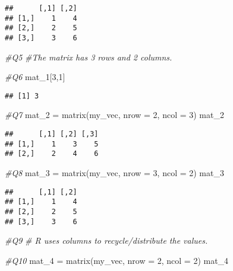 \documentclass[
]{article}
\newenvironment{Shaded}{\begin{snugshade}}{\end{snugshade}}
\newcommand{\AttributeTok}[1]{\textcolor[rgb]{0.77,0.63,0.00}{#1}}
\newcommand{\CommentTok}[1]{\textcolor[rgb]{0.56,0.35,0.01}{\textit{#1}}}
\newcommand{\DecValTok}[1]{\textcolor[rgb]{0.00,0.00,0.81}{#1}}
\newcommand{\FunctionTok}[1]{\textcolor[rgb]{0.00,0.00,0.00}{#1}}
\newcommand{\NormalTok}[1]{#1}
\newcommand{\OtherTok}[1]{\textcolor[rgb]{0.56,0.35,0.01}{#1}}
\begin{document}
\begin{verbatim}
##      [,1] [,2]
## [1,]    1    4
## [2,]    2    5
## [3,]    3    6
\end{verbatim}

\begin{Shaded}
\begin{Highlighting}[]
\CommentTok{\#Q5}
\CommentTok{\#The matrix has 3 rows and 2 columns.}

\CommentTok{\#Q6}
\NormalTok{mat\_1[}\DecValTok{3}\NormalTok{,}\DecValTok{1}\NormalTok{]}
\end{Highlighting}
\end{Shaded}

\begin{verbatim}
## [1] 3
\end{verbatim}

\begin{Shaded}
\begin{Highlighting}[]
\CommentTok{\#Q7}
\NormalTok{mat\_2 }\OtherTok{=} \FunctionTok{matrix}\NormalTok{(my\_vec, }\AttributeTok{nrow =} \DecValTok{2}\NormalTok{, }\AttributeTok{ncol =} \DecValTok{3}\NormalTok{)}
\NormalTok{mat\_2}
\end{Highlighting}
\end{Shaded}

\begin{verbatim}
##      [,1] [,2] [,3]
## [1,]    1    3    5
## [2,]    2    4    6
\end{verbatim}

\begin{Shaded}
\begin{Highlighting}[]
\CommentTok{\#Q8}
\NormalTok{mat\_3 }\OtherTok{=} \FunctionTok{matrix}\NormalTok{(my\_vec, }\AttributeTok{nrow =} \DecValTok{3}\NormalTok{, }\AttributeTok{ncol =} \DecValTok{2}\NormalTok{)}
\NormalTok{mat\_3}
\end{Highlighting}
\end{Shaded}

\begin{verbatim}
##      [,1] [,2]
## [1,]    1    4
## [2,]    2    5
## [3,]    3    6
\end{verbatim}

\begin{Shaded}
\begin{Highlighting}[]
\CommentTok{\#Q9}
\CommentTok{\# R uses columns to recycle/distribute the values.}

\CommentTok{\#Q10}
\NormalTok{mat\_4 }\OtherTok{=} \FunctionTok{matrix}\NormalTok{(my\_vec, }\AttributeTok{nrow =} \DecValTok{2}\NormalTok{, }\AttributeTok{ncol =} \DecValTok{2}\NormalTok{)}
\NormalTok{mat\_4}
\end{Highlighting}
\end{Shaded}
\end{document}
